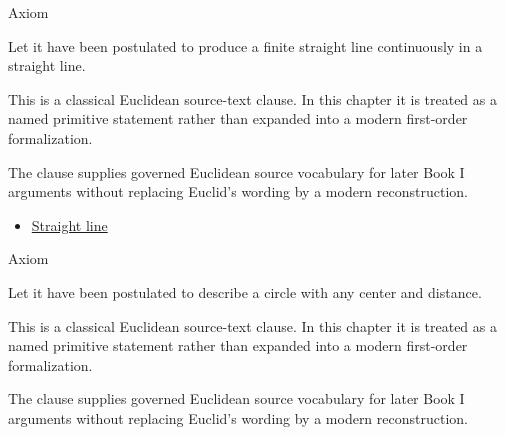 \begin{axiombox}{Axiom}
\begin{axiom}
\label{ax:euclid-postulate-produce-straight-line}
Let it have been postulated to produce a finite straight line continuously in a
straight line.
\end{axiom}
\end{axiombox}
\begin{remark*}
This is a classical Euclidean source-text clause. In this chapter it is treated
as a named primitive statement rather than expanded into a modern first-order
formalization.
\end{remark*}

\begin{remark*}[Interpretation]
The clause supplies governed Euclidean source vocabulary for later Book I
arguments without replacing Euclid's wording by a modern reconstruction.
\end{remark*}

\begin{lra-not-visible}
\begin{dependencies}
\begin{itemize}
  \item \hyperref[def:euclid-straight-line]{Straight line}
\end{itemize}
\end{dependencies}
\end{lra-not-visible}

\begin{axiombox}{Axiom}
\begin{axiom}
\label{ax:euclid-postulate-describe-circle}
Let it have been postulated to describe a circle with any center and distance.
\end{axiom}
\end{axiombox}
\begin{remark*}
This is a classical Euclidean source-text clause. In this chapter it is treated
as a named primitive statement rather than expanded into a modern first-order
formalization.
\end{remark*}

\begin{remark*}[Interpretation]
The clause supplies governed Euclidean source vocabulary for later Book I
arguments without replacing Euclid's wording by a modern reconstruction.
\end{remark*}

